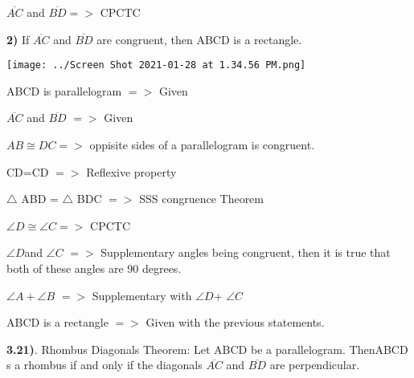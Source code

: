 \documentclass{article}
\begin{document}
$\overline{AC}$ and $\overline{BD} =>$ CPCTC

\vspace{3mm}




\vspace{3mm}


\newpage


	\textbf{2)}  If $\overline{AC}$ and $\overline{BD}$ are congruent, then ABCD is a rectangle.
	
	\texttt{[image: ../Screen Shot 2021-01-28 at 1.34.56 PM.png]}


ABCD is parallelogram  $ => $ Given

\vspace{2mm}

$\overline{AC}$ and $\overline{BD}$ $=>$ Given

\vspace{2mm}

$AB \displaystyle \cong  DC =>$ oppisite sides of a parallelogram is congruent.

\vspace{2mm}

CD=CD $=>$ Reflexive property

\vspace{2mm}

$\triangle$ ABD = $\triangle$ BDC $=>$ SSS congruence Theorem

\vspace{2mm}

$\angle{D} \displaystyle \cong \angle{C} =>$ CPCTC

\vspace{2mm}

$\angle{D}$and $\angle{C}$ $ = >$ Supplementary angles being congruent, then it is true that both of these angles are 90 degrees. 

\vspace{2mm}

$\angle{A} + \angle{B}$ $ = >$ Supplementary with $\angle{D}$+ $\angle{C}$

\vspace{2mm}

ABCD is a rectangle $= >$ Given with the previous statements.



\newpage
\textbf{3.21)}. Rhombus Diagonals Theorem: Let ABCD be a parallelogram. ThenABCD s a rhombus if and only if the diagonals $\overline{AC}$ and $\overline{BD}$ are perpendicular.
\vspace{2mm}
\end{document}
